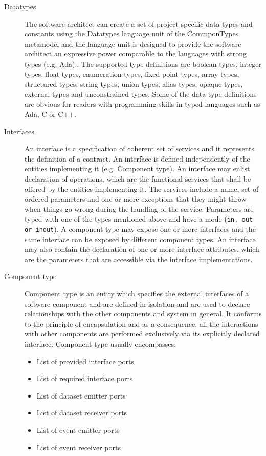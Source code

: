 \begin{description}
\item [Datatypes] The software architect can create a set of project-specific data types and constants using the Datatypes language unit of the CommponTypes metamodel and the language unit is designed to provide the software architect an expressive power comparable to the languages with strong types (e.g. Ada).\cite{SpecMetamodel}. The supported type definitions are boolean types, integer types, float types, enumeration types, fixed point types, array types, structured types, string types, union types, alias types, opaque types, external types and unconstrained types. Some of the data type definitions are obvious for readers with programming skills in typed languages such as Ada, C or C++. 

\item [Interfaces] An interface is a specification of coherent set of services and it represents the definition of a contract. An interface is defined independently of the entities implementing it (e.g. Component type). An interface may enlist declaration of operations, which are the functional services that shall be offered by the entities implementing it. The services include a name, set of ordered parameters and one or more exceptions that they might throw when things go wrong during the handling of the service. Parameters are typed with one of the types mentioned above and have a mode (\texttt{in, out or inout}). A component type may expose one or more interfaces and the same interface can be exposed by different component types. An interface may also contain the declaration of one or more interface attributes, which are the parameters that are accessible via the interface implementations.

\item [Component type] Component type is an entity which specifies the external interfaces of a software component and are defined in isolation and are used to declare relationships with the other components and system in general. It conforms to the principle of encapsulation and as a consequence, all the interactions with other components are performed exclusively via its explicitly declared interface. Component type usually encompasses:
\begin{itemize}
\item List of provided interface ports
\item List of required interface ports
\item List of dataset emitter ports 
\item List of dataset receiver ports
\item List of event emitter ports
\item List of event receiver ports 
\end{itemize}


\end{description}
